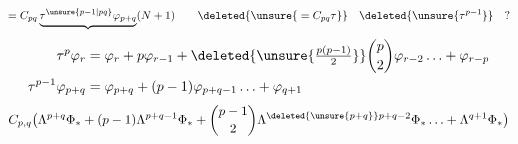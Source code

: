 \[
=C_{pq}\underbrace{\tau^{\unsure{p-1|pq}}\varphi_{p+q}}(N+1)
\qquad\deleted{\unsure{{}=C_{pq}\tau}}\quad\deleted{\unsure{\tau^{p-1}}}\quad ?
\]
\[
\begin{aligned}
\tau^p\varphi_r&=\varphi_r+p\varphi_{r-1}+\deleted{\unsure{\tfrac{p(p-1)}2}}\binom p2\varphi_{r-2}\ldots+\varphi_{r-p}\\
\tau^{p-1}\varphi_{p+q}&=\varphi_{p+q}+(p-1)\varphi_{p+q-1}\ldots+\varphi_{q+1}
\end{aligned}
\]
\[
C_{p,q}\bigl(\Lambda^{p+q}\Phi_*+(p-1)\Lambda^{p+q-1}\Phi_*+\binom{p-1}{2}\Lambda^{\deleted{\unsure{p+q}}p+q-2}\Phi_*\ldots+\Lambda^{q+1}\Phi_*\bigr)
\]
